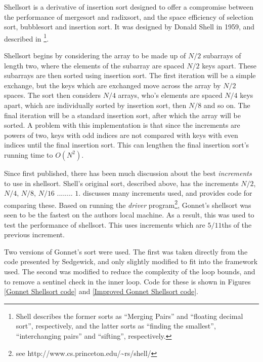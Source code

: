 \label{shell}

Shellsort is a derivative of insertion sort designed to offer a compromise
between the performance of mergesort and radixsort, and the space efficiency of
selection sort, bubblesort and insertion sort. It was designed by Donald Shell
in 1959, and described in \cite{Shell59}\footnote{Shell describes the former
sorts as ``Merging Pairs'' and ``floating decimal sort'', respectively, and the
latter sorts as ``finding the smallest'', ``interchanging pairs'' and ``sifting'',
respectively.}.

Shellsort begins by considering the array to be made up of $N/2$ subarrays of
length two, where the elements of the subarray are spaced $N/2$ keys apart.
These subarrays are then sorted using insertion sort. The first iteration will
be a simple exchange, but the keys which are exchanged move across the array by
$N/2$ spaces. The sort then considers $N/4$ arrays, who's elements are spaced
$N/4$ keys apart, which are individually sorted by insertion sort, then $N/8$
and so on. The final iteration will be a standard insertion sort, after which
the array will be sorted. A problem with this implementation is that since the
increments are powers of two, keys with odd indices are not compared with keys
with even indices until the final insertion sort. This can lengthen the final
insertion sort's running time to $O(N^2)$.

Since first published, there has been much discussion about the best
\textit{increments} to use in shellsort. Shell's original sort, described above,
has the increments $N/2$, $N/4$, $N/8$, $N/16$ ........ $1$. \cite{Sedgewick96}
discusses many increments used, and provides code for comparing these. Based
on running the \textit{driver} program\footnote{see
http://www.cs.princeton.edu/\textasciitilde{}rs/shell/}, Gonnet's shellsort was
seen to be the fastest on the authors local machine. As a result, this was used
to test the performance of shellsort. This uses increments which are $5/11$ths
of the previous increment.

Two versions of Gonnet's sort were used. The first was taken directly from the
code presented by Sedgewick, and only slightly modified to fit into the framework used.
The second was modified to reduce the complexity of the loop bounds, and to
remove a sentinel check in the inner loop. Code for these is shown in Figures
\ref{Gonnet Shellsort code} and \ref{Improved Gonnet Shellsort code}.

